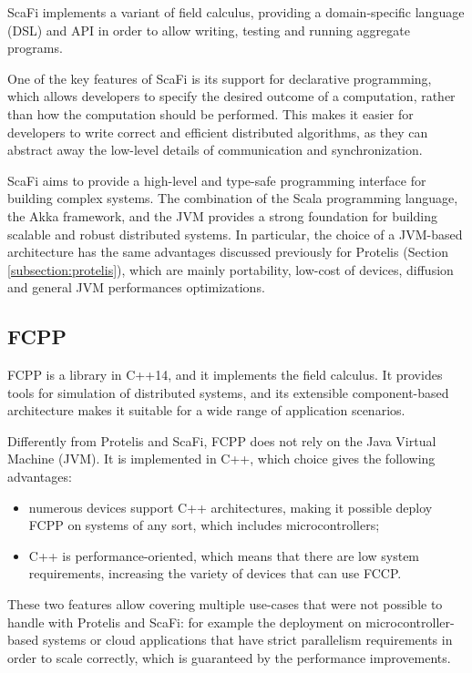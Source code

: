 ScaFi implements a variant of field calculus, providing a domain-specific language (DSL) and API in order to allow writing, testing and running aggregate programs.

One of the key features of ScaFi is its support for declarative programming, which allows developers to specify the desired outcome of a computation, rather than how the computation should be performed. This makes it easier for developers to write correct and efficient distributed algorithms, as they can abstract away the low-level details of communication and synchronization.

ScaFi aims to provide a high-level and type-safe programming interface for building complex systems.\newline
The combination of the Scala programming language, the Akka framework, and the JVM provides a strong foundation for building scalable and robust distributed systems.\newline
In particular, the choice of a JVM-based architecture has the same advantages discussed previously for Protelis (Section \ref{subsection:protelis}), which are mainly portability, low-cost of devices, diffusion and general JVM performances optimizations.

\subsection{FCPP}\label{subsection:fcpp}
FCPP \cite{fcpp_introduction} is a library in C++14, and it implements the field calculus.\newline
It provides tools for simulation of distributed systems, and its extensible component-based architecture makes it suitable for a wide range of application scenarios.

Differently from Protelis and ScaFi, FCPP does not rely on the Java Virtual Machine (JVM). It is implemented in C++, which choice gives the following advantages:
\begin{itemize}
    \item numerous devices support C++ architectures, making it possible deploy FCPP on systems of any sort, which includes microcontrollers;
    \item C++ is performance-oriented, which means that there are low system requirements, increasing the variety of devices that can use FCCP.
\end{itemize}

These two features allow covering multiple use-cases that were not possible to handle with Protelis and ScaFi: for example the deployment on microcontroller-based systems or cloud applications that have strict parallelism requirements in order to scale correctly, which is guaranteed by the performance improvements.

